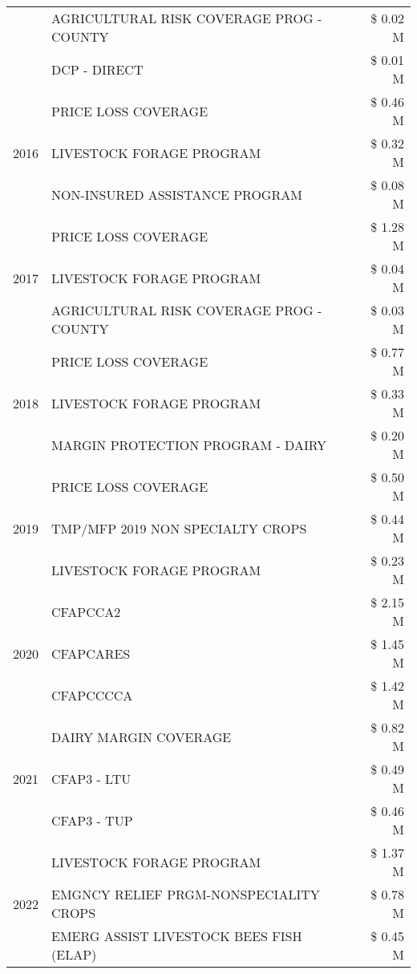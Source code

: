 \begin{tabular}{llr}
 & AGRICULTURAL RISK COVERAGE PROG - COUNTY & \$ 0.02 M \\
 & DCP - DIRECT & \$ 0.01 M \\
\cline{1-3}
\multirow[t]{3}{*}{2016} & PRICE LOSS COVERAGE & \$ 0.46 M \\
 & LIVESTOCK FORAGE PROGRAM & \$ 0.32 M \\
 & NON-INSURED ASSISTANCE PROGRAM & \$ 0.08 M \\
\cline{1-3}
\multirow[t]{3}{*}{2017} & PRICE LOSS COVERAGE & \$ 1.28 M \\
 & LIVESTOCK FORAGE PROGRAM & \$ 0.04 M \\
 & AGRICULTURAL RISK COVERAGE PROG - COUNTY & \$ 0.03 M \\
\cline{1-3}
\multirow[t]{3}{*}{2018} & PRICE LOSS COVERAGE & \$ 0.77 M \\
 & LIVESTOCK FORAGE PROGRAM & \$ 0.33 M \\
 & MARGIN PROTECTION PROGRAM - DAIRY & \$ 0.20 M \\
\cline{1-3}
\multirow[t]{3}{*}{2019} & PRICE LOSS COVERAGE & \$ 0.50 M \\
 & TMP/MFP 2019 NON SPECIALTY CROPS & \$ 0.44 M \\
 & LIVESTOCK FORAGE PROGRAM & \$ 0.23 M \\
\cline{1-3}
\multirow[t]{3}{*}{2020} & CFAPCCA2 & \$ 2.15 M \\
 & CFAPCARES & \$ 1.45 M \\
 & CFAPCCCCA & \$ 1.42 M \\
\cline{1-3}
\multirow[t]{3}{*}{2021} & DAIRY MARGIN COVERAGE & \$ 0.82 M \\
 & CFAP3 - LTU & \$ 0.49 M \\
 & CFAP3 - TUP & \$ 0.46 M \\
\cline{1-3}
\multirow[t]{3}{*}{2022} & LIVESTOCK FORAGE PROGRAM & \$ 1.37 M \\
 & EMGNCY RELIEF PRGM-NONSPECIALITY CROPS & \$ 0.78 M \\
 & EMERG ASSIST LIVESTOCK BEES FISH (ELAP) & \$ 0.45 M \\
\cline{1-3}
\bottomrule
\end{tabular}
